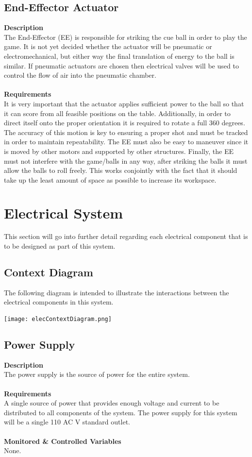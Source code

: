 \documentclass[titlepage]{article}
\begin{document}
\subsection{End-Effector Actuator}
\textbf{Description}\\
The End-Effector (EE) is responsible for striking the cue ball in order to play the game. It is not yet decided whether the actuator will be pneumatic or electromechanical, but either way the final translation of energy to the ball is similar. If pneumatic actuators are chosen then electrical valves will be used to control the flow of air into the pneumatic chamber.\\~\\
\textbf{Requirements}\\
It is very important that the actuator applies sufficient power to the ball so that it can score from all feasible positions on the table. Additionally, in order to direct itself onto the proper orientation it is required to rotate a full 360 degrees. The accuracy of this motion is key to ensuring a proper shot and must be tracked in order to maintain repeatability. The EE must also be easy to maneuver since it is moved by other motors and supported by other structures. Finally, the EE must not interfere with the game/balls in any way, after striking the balls it must allow the balls to roll freely. This works conjointly with the fact that it should take up the least amount of space as possible to increase its workspace.



\section{Electrical System}
This section will go into further detail regarding each electrical component that is to be designed as part of this system.
\subsection{Context Diagram}
The following diagram is intended to illustrate the interactions between the electrical components in this system.
\begin{center}
	\texttt{[image: elecContextDiagram.png]}
\label{fig:elecContextDiagramFig}
\end{center}

\subsection{Power Supply}
\textbf{Description}\\
The power supply is the source of power for the entire system.\\~\\
\textbf{Requirements}\\
A single source of power that provides enough voltage and current to be distributed to all components of the system. The power supply for this system will be a single 110 AC V standard outlet.\\~\\
\textbf{Monitored \& Controlled Variables}\\
None.
\end{document}
